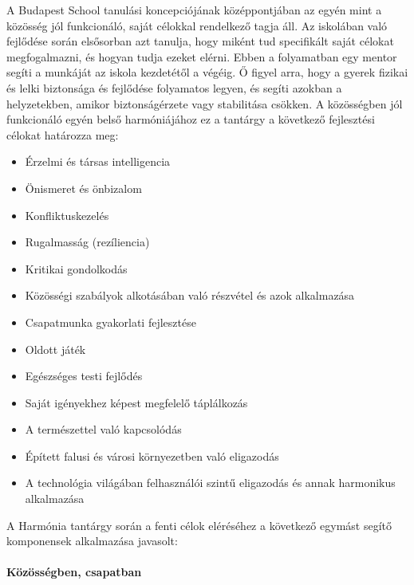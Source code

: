 A Budapest School tanulási koncepciójának középpontjában az egyén mint a közösség jól funkcionáló, saját célokkal rendelkező tagja áll. Az iskolában való fejlődése során elsősorban azt tanulja, hogy miként tud specifikált saját célokat megfogalmazni, és hogyan tudja ezeket elérni. Ebben a folyamatban egy mentor segíti a munkáját az iskola kezdetétől a végéig. Ő figyel arra, hogy a gyerek fizikai és lelki biztonsága és fejlődése folyamatos legyen, és segíti azokban a helyzetekben, amikor biztonságérzete vagy stabilitása csökken. A közösségben jól funkcionáló egyén belső harmóniájához ez a tantárgy a következő fejlesztési célokat határozza meg:
\begin{itemize}
\item Érzelmi és társas intelligencia

\item Önismeret és önbizalom

\item Konfliktuskezelés

\item Rugalmasság (rezíliencia)

\item Kritikai gondolkodás

\item Közösségi szabályok alkotásában való részvétel és azok alkalmazása

\item Csapatmunka gyakorlati fejlesztése

\item Oldott játék

\item Egészséges testi fejlődés

\item Saját igényekhez képest megfelelő táplálkozás

\item A természettel való kapcsolódás

\item Épített falusi és városi környezetben való eligazodás

\item A technológia világában felhasználói szintű eligazodás és annak harmonikus alkalmazása
\end{itemize}

A Harmónia tantárgy során a fenti célok eléréséhez a következő egymást segítő komponensek alkalmazása javasolt:

\paragraph{Közösségben, csapatban}

